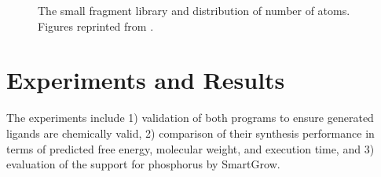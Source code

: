 \begin{figure}
\centering
{}
\caption{The small fragment library and distribution of number of atoms. Figures reprinted from \citep{466-2009}.}
\label{fig:SmallFragmentLibrary}
\end{figure}

\section{Experiments and Results}

The experiments include 1) validation of both programs to ensure generated ligands are chemically valid, 2) comparison of their synthesis performance in terms of predicted free energy, molecular weight, and execution time, and 3) evaluation of the support for phosphorus by SmartGrow.

